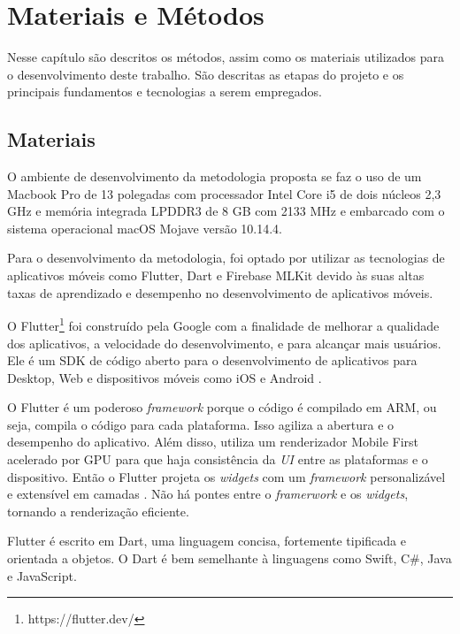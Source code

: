 \chapter{Materiais e Métodos} \label{cap:metod}

Nesse capítulo são descritos os métodos, assim como os materiais utilizados para o desenvolvimento deste trabalho. São descritas as etapas do projeto e os principais fundamentos e tecnologias a serem empregados.


\section{Materiais}
O ambiente de desenvolvimento da metodologia proposta se faz o uso de um Macbook Pro de 13 polegadas com processador Intel Core i5 de dois núcleos 2,3 GHz e memória integrada LPDDR3 de 8 GB com 2133 MHz e embarcado com o sistema operacional macOS Mojave versão 10.14.4.  

Para o desenvolvimento da metodologia, foi optado por utilizar as tecnologias de aplicativos móveis como Flutter, Dart e Firebase MLKit devido às suas altas taxas de aprendizado e desempenho no desenvolvimento de aplicativos móveis.

O Flutter\footnote{https://flutter.dev/} foi construído pela Google com a finalidade de melhorar a qualidade dos aplicativos, a velocidade do desenvolvimento, e para alcançar mais usuários. Ele é um SDK  de código aberto para o desenvolvimento de aplicativos para Desktop, Web e dispositivos móveis como iOS e Android \cite{ARSTECHNICA2017}.


O Flutter é um poderoso \textit{framework} porque o código é compilado em ARM, ou seja, compila o código para cada plataforma. Isso agiliza a abertura e o desempenho do aplicativo. Além disso, utiliza um renderizador Mobile First acelerado por GPU para que haja consistência da \textit{UI} entre as plataformas e o dispositivo. Então o Flutter projeta os \textit{widgets} com um \textit{framework} personalizável e extensível em camadas \cite{IMASTERS}. Não há pontes entre o \textit{framerwork} e os \textit{widgets}, tornando a renderização eficiente. 

Flutter é escrito em Dart, uma linguagem concisa, fortemente tipificada e orientada a objetos. O Dart é bem semelhante à linguagens como Swift, C#, Java e JavaScript.



